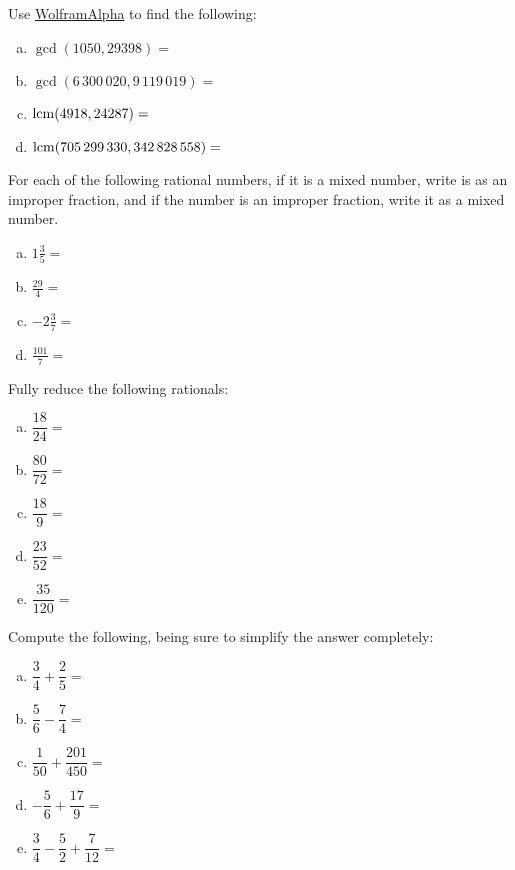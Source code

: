 \documentclass[11pt,letterpaper]{article}
\begin{document}
\newpage



 Use \href{https://www.wolframalpha.com/}{WolframAlpha} to find the following: \pspace
\begin{enumerate}[(a)] 
\item $\gcd(1050, 29398)=$ \vspace{0.5cm}
\item $\gcd(6\,300\,020, 9\,119\,019)=$ \vspace{0.5cm}
\item $\operatorname{lcm}(4918, 24287)=$ \vspace{0.5cm}
\item $\operatorname{lcm}(705\,299\,330, 342\,828\,558)=$ \vspace{0.5cm}
\end{enumerate}



\vfill



 For each of the following rational numbers, if it is a mixed number, write is as an improper fraction, and if the number is an improper fraction, write it as a mixed number. \pspace
\begin{enumerate}[(a)] \itemsep=2ex
\item $1\frac{3}{5}=$
\item $\frac{29}{4}=$
\item $-2\frac{3}{7}=$
\item $\frac{101}{7}=$
\end{enumerate} \pspace



\vfill



 Fully reduce the following rationals: \pspace
\begin{enumerate}[(a)] \itemsep=2ex
\item $\dfrac{18}{24}=$
\item $\dfrac{80}{72}=$
\item $\dfrac{18}{9}=$
\item $\dfrac{23}{52}=$
\item $\dfrac{35}{120}=$
\end{enumerate} \pspace



\vfill
\newpage



 Compute the following, being sure to simplify the answer completely: \pspace
\begin{enumerate}[(a)] \itemsep=2ex
\item $\dfrac{3}{4} + \dfrac{2}{5}=$
\item $\dfrac{5}{6} - \dfrac{7}{4}=$
\item $\dfrac{1}{50} + \dfrac{201}{450}=$
\item $-\dfrac{5}{6} + \dfrac{17}{9}=$
\item $\dfrac{3}{4} - \dfrac{5}{2} + \dfrac{7}{12}=$
\end{enumerate}
\end{document}
